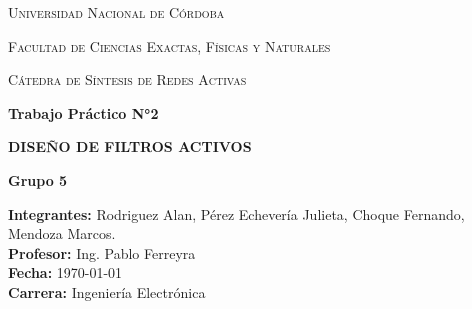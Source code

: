 \documentclass[12pt]{article}
\begin{document}
\begin{titlepage}
    \centering
    {\scshape\LARGE Universidad Nacional de Córdoba \par}
    \vspace{1cm}
    {\scshape\Large Facultad de Ciencias Exactas, Físicas y Naturales\par}
    \vspace{1cm}
    {\scshape\Large Cátedra de Síntesis de Redes Activas\par}
    \vfill
    {\huge\bfseries Trabajo Práctico N°2\par}
    \vspace{0.5cm}
    {\Large\textbf{DISEÑO DE FILTROS ACTIVOS}\par}
    {\Large\textbf{Grupo 5}\par}
    \vspace{1cm}
    \begin{flushleft}
        \textbf{Integrantes:} Rodriguez Alan, Pérez Echevería Julieta, Choque Fernando, Mendoza Marcos. \\
        \textbf{Profesor:} Ing. Pablo Ferreyra \\
        \textbf{Fecha:} \today \\
        \textbf{Carrera:} Ingeniería Electrónica
    \end{flushleft}
    \vfill
\end{titlepage}

\tableofcontents

\newpage

\begin{abstract}
En el presente informe se documenta el diseño, simulación e implementación experimental de un filtro analógico activo a partir de especificaciones de frecuencia ($f_p = 1000\,\text{Hz}$, $f_s = 4000\,\text{Hz}$, $A_s = 24\,\text{dB}$). Tras contrastar distintas aproximaciones mediante cómputo numérico (\texttt{SciPy}), se seleccionó un filtro pasabajos de Bessel de 3er orden para priorizar la linealidad de fase y la máxima planitud del retardo de grupo en la banda de paso. La arquitectura circuital se implementó con amplificadores operacionales \texttt{TL082} en cascada de ganancia unitaria: una etapa pasiva $RC$ de primer orden desacoplada por un seguidor de tensión, seguida de una celda activa bicuadrática \textit{Sallen-Key} con dimensionamiento asimétrico. Mediante análisis simbólico (\texttt{SymPy}) y simulaciones en régimen permanente, transitorio y estadístico Monte Carlo (\texttt{LTspice}), se verificó una baja sensibilidad paramétrica global ($|S^Y_x| \le 0,5$), una atenuación de rechazo superior a los $24\,\text{dB}$ requeridos y una respuesta temporal libre de sobrepico. Finalmente, se complementó el sistema con una celda ecualizadora pasa-todo de segundo orden para uniformar el retardo en banda y se validó el desempeño mediante mediciones físicas en laboratorio.


Link al repositorio de Github con notebooks ejecutables y archivos de LTSpice: https://github.com/JuliPerezE/SRA-TP-Filtros-Grupo5/tree/main

\end{abstract}
\end{document}
